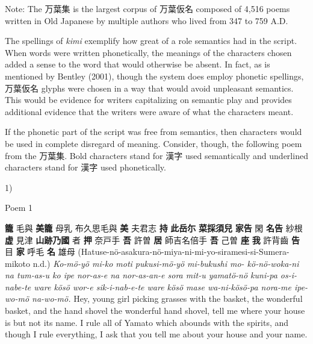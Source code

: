 \par{Note: The 万葉集 is the largest corpus of 万葉仮名 composed of 4,516 poems written in Old Japanese by multiple authors who lived from 347 to 759 A.D. }

\par{ The spellings of \emph{kimi }exemplify how great of a role semantics had in the script. When words were written phonetically, the meanings of the characters chosen added a sense to the word that would otherwise be absent. In fact, as is mentioned by Bentley (2001), though the system does employ phonetic spellings, 万葉仮名 glyphs were chosen in a way that would avoid unpleasant semantics. This would be evidence for writers capitalizing on semantic play and provides additional evidence that the writers were aware of what the characters meant. }

\par{ If the phonetic part of the script was free from semantics, then characters would be used in complete disregard of meaning. Consider, though, the following poem from the 万葉集. Bold characters stand for 漢字 used semantically and underlined characters stand for 漢字 used phonetically. }

\par{1) }

\par{Poem 1 }

\par{\textbf{籠 }毛與  \textbf{美籠 }母乳  布久思毛與  \textbf{美 }夫君志 \textbf{持 } \textbf{此岳尓 } \textbf{菜採須兒 } \textbf{家告 }閑  \textbf{名告 }紗根  \textbf{虚 }見津  \textbf{山跡乃國 }者  \textbf{押 }奈戸手  \textbf{吾 }許曽 \textbf{居 } 師吉名倍手  \textbf{吾 }己曽 \textbf{座 } \textbf{我 }許背齒  \textbf{告 }目  \textbf{家 }呼毛 \textbf{名 }雄母  (Hatuse-nö-asakura-nö-miya-ni-mi-yo-siramesi-si-Sumera-mikoto n.d.) \hfill\break
\emph{Ko-mö-yö mi-ko moti pukusi-mö-yö mi-bukushi mo- kö-nö-woka-ni na tum-as-u ko ipe nor-as-e na nor-as-an-e sora mit-u yamatö-nö kuni-pa os-i-nabe-te ware kösö wor-e sik-i-nab-e-te ware kösö mase wa-ni-kösö-pa nora-me ipe-wo-mö na-wo-mö. \hfill\break
}Hey, young girl picking grasses with the basket, the wonderful basket, and the hand shovel the wonderful hand shovel, tell me where your house is but not its name. I rule all of Yamato which abounds with the spirits, and though I rule everything, I ask that you tell me about your house and your name. }

